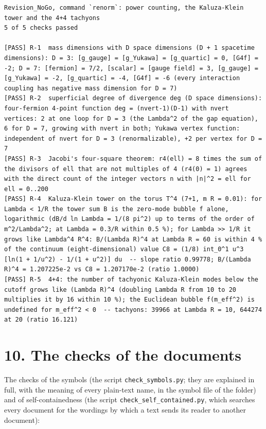 \documentclass[
  10pt,
]{article}
\begin{document}
\begin{verbatim}
Revision_NoGo, command `renorm`: power counting, the Kaluza-Klein tower and the 4+4 tachyons
5 of 5 checks passed

[PASS] R-1  mass dimensions with D space dimensions (D + 1 spacetime dimensions): D = 3: [g_gauge] = [g_Yukawa] = [g_quartic] = 0, [G4f] = -2; D = 7: [fermion] = 7/2, [scalar] = [gauge field] = 3, [g_gauge] = [g_Yukawa] = -2, [g_quartic] = -4, [G4f] = -6 (every interaction coupling has negative mass dimension for D = 7)
[PASS] R-2  superficial degree of divergence deg (D space dimensions): four-fermion 4-point function deg = (nvert-1)(D-1) with nvert vertices: 2 at one loop for D = 3 (the Lambda^2 of the gap equation), 6 for D = 7, growing with nvert in both; Yukawa vertex function: independent of nvert for D = 3 (renormalizable), +2 per vertex for D = 7
[PASS] R-3  Jacobi's four-square theorem: r4(ell) = 8 times the sum of the divisors of ell that are not multiples of 4 (r4(0) = 1) agrees with the direct count of the integer vectors n with |n|^2 = ell for ell = 0..200
[PASS] R-4  Kaluza-Klein tower on the torus T^4 (7+1, m R = 0.01): for Lambda < 1/R the tower sum B is the zero-mode bubble f alone, logarithmic (dB/d ln Lambda = 1/(8 pi^2) up to terms of the order of m^2/Lambda^2; at Lambda = 0.3/R within 0.5 %); for Lambda >> 1/R it grows like Lambda^4 R^4: B/(Lambda R)^4 at Lambda R = 60 is within 4 % of the continuum (eight-dimensional) value C8 = (1/8) int_0^1 u^3 [ln(1 + 1/u^2) - 1/(1 + u^2)] du  -- slope ratio 0.99778; B/(Lambda R)^4 = 1.207225e-2 vs C8 = 1.207170e-2 (ratio 1.0000)
[PASS] R-5  4+4: the number of tachyonic Kaluza-Klein modes below the cutoff grows like (Lambda R)^4 (doubling Lambda R from 10 to 20 multiplies it by 16 within 10 %); the Euclidean bubble f(m_eff^2) is undefined for m_eff^2 < 0  -- tachyons: 39966 at Lambda R = 10, 644274 at 20 (ratio 16.121)
\end{verbatim}

\hypertarget{the-checks-of-the-documents}{%
\section{10. The checks of the
documents}\label{the-checks-of-the-documents}}

The checks of the symbols (the script \texttt{check\_symbols.py}; they
are explained in full, with the meaning of every plain-text name, in the
symbol file of the folder) and of self-containedness (the script
\texttt{check\_self\_contained.py}, which searches every document for
the wordings by which a text sends its reader to another document):
\end{document}
